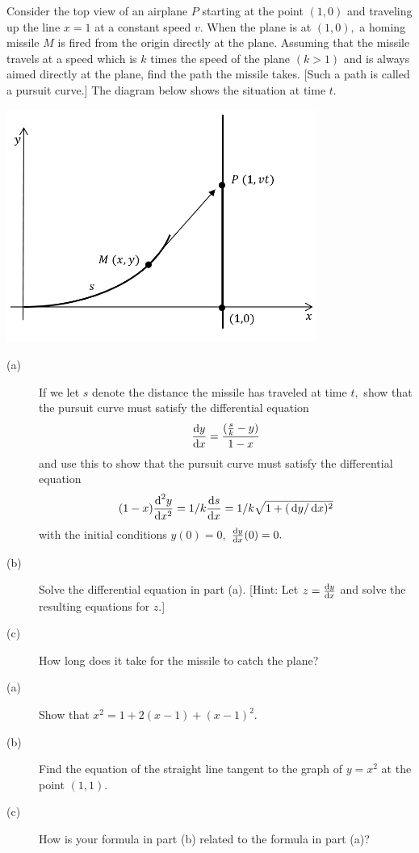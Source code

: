 \begin{ProblemSection}
  \begin{myproblem}{} 
    Consider the top view of an airplane $P$ starting at the point
    $(1,0)$ and traveling up the line $x=1$ at a constant speed $v.$
    When the plane is at $(1,0),$ a homing missile $M$ is fired from
    the origin directly at the plane. Assuming that the missile
    travels at a speed which is $k$ times the speed of the plane
    $(k>1)$ and is always aimed directly at the plane, find the path
    the missile takes.  [Such a path is called a pursuit curve.]  The
    diagram below shows the situation at time $t.$\\
    \centerline{\includegraphics*[height=3in,width=4in]{Figures/PursuitCurve}}
    \begin{description}
    \item [(a)]  If we let $s$ denote the distance the missile has traveled
      at time $t,$ show that the pursuit curve must satisfy the
      differential equation
      \[\frac{\text{d}{y}}{\text{d}{x}}=\frac{(\frac{s}{k}-y)}{1-x}\]
      and use this to show that the pursuit curve must satisfy the
      differential equation
      \[(1-x) \frac{\text{d}^{2}{y}}{\text{d}{x}^{2}}=1/k \frac{\text{d}{s}}{\text{d}{x}}=1/k \sqrt{1+(\thinspace{\rm d}y/\thinspace{\rm d}x)^2}\]
      with the initial conditions $y(0)=0,$ $\frac{\text{d}{y}}{\text{d}{x}}(0)=0.$
    \item[(b)]  Solve the differential equation in part (a).  [Hint: Let
      $z=\frac{\text{d}{y}}{\text{d}{x}}$ and solve the resulting equations for $z.$]
    \item[(c)]  How long does it take for the missile to catch the plane?
    \end{description}
  \end{myproblem}

\begin{myproblem}{}
  \begin{description}
  \item[(a)] Show that $x^2=1+2(x-1) +(x-1)^2.$
  \item[(b)] Find the equation of the straight line tangent to the
    graph of $y=x^2$ at the point $(1,1).$
  \item[(c)] How is your formula in part (b) related to the formula in
    part (a)?
  \end{description}
\end{myproblem}


\end{ProblemSection}
